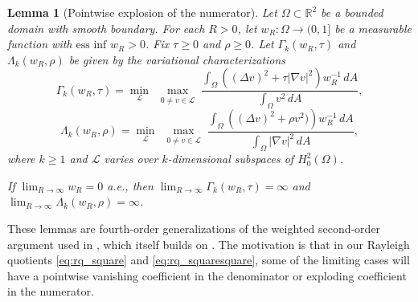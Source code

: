 \documentclass[11pt]{amsart}
\newtheorem{lemma}[theorem]{Lemma}
\theoremstyle{definition}
\numberwithin{equation}{section}
\newcommand{\R}{\mathbb{R}}
\begin{document}
\begin{lemma}[Pointwise explosion of the numerator]\label{lem:ptwisevanfourthorder--numer}
Let $\Omega \subset \R^2$ be a bounded domain with smooth boundary. For each $R > 0$, let $w_R: \Omega\to (0,1]$ be a measurable function with $\text{ess inf } w_R > 0$. Fix $\tau \geq 0$ and $\rho \geq 0$. Let $\Gamma_k(w_R, \tau)$ and $\Lambda_k(w_R, \rho)$ be given by the variational characterizations
$$
\Gamma_k(w_R, \tau)
= \min_{\mathcal L}\ \max_{\substack{0\neq v\in\mathcal L}}
\frac{\displaystyle \int_{\Omega}\left((\Delta v)^2 + \tau |\nabla v|^2\right)w_R^{-1}\,dA}{\displaystyle \int_{\Omega} v^2\,dA},
$$
$$
\Lambda_k(w_R, \rho)
= \min_{\mathcal L}\ \max_{\substack{0\neq v\in\mathcal L}}
\frac{\displaystyle \int_{\Omega}\left((\Delta v)^2 + \rho v^2)\right)w_R^{-1}\,dA}{\displaystyle \int_{\Omega} |\nabla v|^2\,dA},
$$
where $k \geq 1$ and $\mathcal L$ varies over $k$-dimensional subspaces of $H_0^2(\Omega)$. 

If $\lim_{R\to\infty} w_R = 0$ a.e., then $\lim_{R\to\infty} \Gamma_k(w_R,\tau)=\infty$ and $\lim_{R\to\infty} \Lambda_k(w_R,\rho)=\infty$.
\end{lemma}
These lemmas are fourth-order generalizations of the weighted second-order argument used in \cite{H25}, which itself builds on \cite[Lemma 8]{LL22}. The motivation is that in our Rayleigh quotients \eqref{eq:rq_square} and \eqref{eq:rq_squaresquare}, some of the limiting cases will have a pointwise vanishing coefficient in the denominator or exploding coefficient in the numerator.
\end{document}

